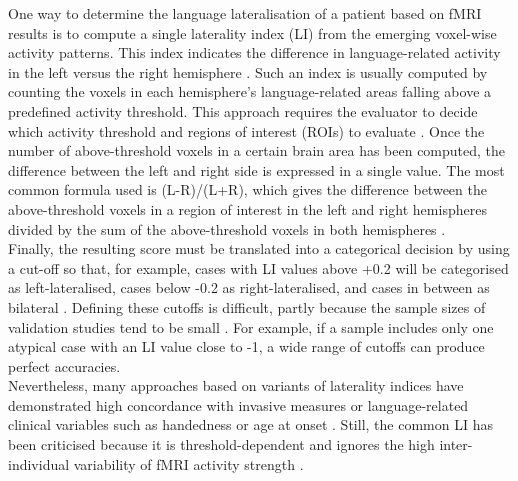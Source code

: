 \documentclass[fleqn,10pt]{SelfArx} %
\begin{document}
One way to determine the language lateralisation of a patient based on fMRI results is to compute a single laterality index (LI) from the emerging voxel-wise activity patterns. This index indicates the difference in language-related activity in the left versus the right hemisphere \citep{Chlebus_2006, Jansen_2006}. Such an index is usually computed by counting the voxels in each hemisphere’s language-related areas falling above a predefined activity threshold. This approach requires the evaluator to decide which activity threshold and regions of interest (ROIs) to evaluate \citep{Gaillard_2002, Adcock_2003}. Once the number of above-threshold voxels in a certain brain area has been computed, the difference between the left and right side is expressed in a single value. The most common formula used is (L-R)/(L+R), which gives the difference between the above-threshold voxels in a region of interest in the left and right hemispheres divided by the sum of the above-threshold voxels in both hemispheres \citep{Seghier_2008}.\\
Finally, the resulting score must be translated into a categorical decision by using a cut-off so that, for example, cases with LI values above +0.2 will be categorised as left-lateralised, cases below -0.2 as right-lateralised, and cases in between as bilateral \citep{Wilke_2011}. Defining these cutoffs is difficult, partly because the sample sizes of validation studies tend to be small \citep{Dym_2011}. For example, if a sample includes only one atypical case with an LI value close to -1, a wide range of cutoffs can produce perfect accuracies.\\
Nevertheless, many approaches based on variants of laterality indices have demonstrated high concordance with invasive measures \citep{Jones_2011, Janecek_2013} or language-related clinical variables such as handedness or age at onset \citep{Berl_2014}. Still, the common LI has been criticised because it is threshold-dependent and ignores the high inter-individual variability of fMRI activity strength \citep{Suarez_2009, Strandberg_2010}.\\
\end{document}
